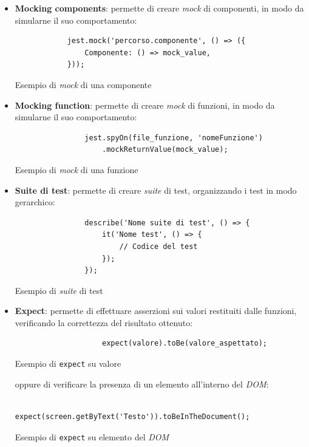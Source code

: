 \begin{itemize}
    \item \textbf{Mocking components}: permette di creare \textit{\gls{mock}\glox} di componenti, in modo da simularne il suo comportamento:
          \begin{listing}[H]
              \begin{verbatim}
            jest.mock('percorso.componente', () => ({
                Componente: () => mock_value,
            }));
            \end{verbatim}
              \caption{Esempio di \textit{mock} di una componente}
              \label{listing:mock_component}
          \end{listing}
    \item \textbf{Mocking function}: permette di creare \textit{mock} di funzioni, in modo da simularne il suo comportamento:
          \begin{listing}[H]
              \begin{verbatim}
                jest.spyOn(file_funzione, 'nomeFunzione')
                    .mockReturnValue(mock_value);
            \end{verbatim}
              \caption{Esempio di \textit{mock} di una funzione}
              \label{listing:mock_function}
          \end{listing}
    \item \textbf{Suite di test}: permette di creare \textit{suite} di test, organizzando i test in modo gerarchico:
          \begin{listing}[H]
              \begin{verbatim}
                describe('Nome suite di test', () => {
                    it('Nome test', () => {
                        // Codice del test
                    });
                });
            \end{verbatim}
              \caption{Esempio di \textit{suite} di test}
              \label{listing:test_suite}
          \end{listing}
    \item \textbf{Expect}: permette di effettuare asserzioni sui valori restituiti dalle funzioni, verificando la correttezza
          del risultato ottenuto:
          \begin{listing}[H]
              \begin{verbatim}
                    expect(valore).toBe(valore_aspettato);
                \end{verbatim}
              \caption{Esempio di \texttt{expect} su valore}
              \label{listing:expect}
          \end{listing}
          oppure di verificare la presenza di un elemento all'interno del \textit{DOM}:
          \begin{listing}[H]
              \begin{verbatim}
                    expect(screen.getByText('Testo')).toBeInTheDocument();
                \end{verbatim}
              \caption{Esempio di \texttt{expect} su elemento del \textit{DOM}}
              \label{listing:expect_dom}
          \end{listing}
\end{itemize}
